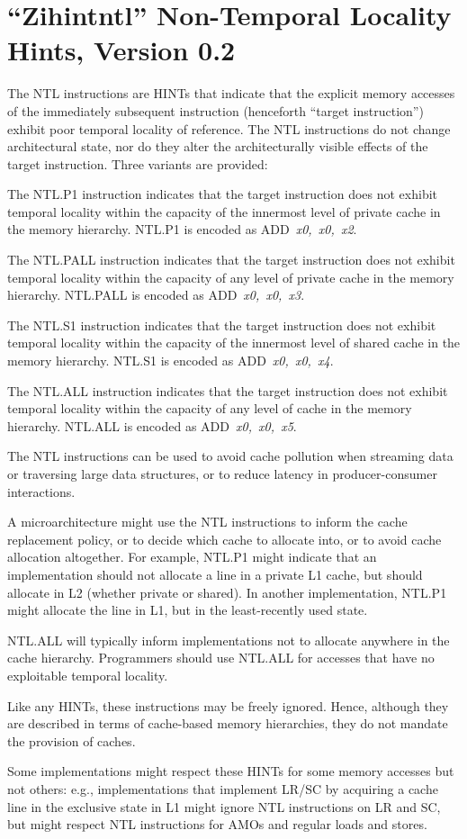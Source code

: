 \chapter{``Zihintntl'' Non-Temporal Locality Hints, Version 0.2}
\label{chap:zihintpause}

The NTL instructions are HINTs that indicate that the explicit memory accesses of the immediately subsequent
instruction (henceforth ``target instruction'') exhibit poor temporal locality of reference.
The NTL instructions do not change architectural state, nor do they alter the
architecturally visible effects of the target instruction.
Three variants are provided:

The NTL.P1 instruction indicates that the target instruction
does not exhibit temporal locality within the capacity of the innermost level
of private cache in the memory hierarchy.
NTL.P1 is encoded as \mbox{ADD {\em x0, x0, x2}}.

The NTL.PALL instruction indicates that the target instruction
does not exhibit temporal locality within the capacity of any
level of private cache in the memory hierarchy.
NTL.PALL is encoded as \mbox{ADD {\em x0, x0, x3}}.

The NTL.S1 instruction indicates that the target instruction
does not exhibit temporal locality within the capacity of the innermost level
of shared cache in the memory hierarchy.
NTL.S1 is encoded as \mbox{ADD {\em x0, x0, x4}}.

The NTL.ALL instruction indicates that the target
instruction does not exhibit temporal locality within the capacity of any
level of cache in the memory hierarchy.
NTL.ALL is encoded as \mbox{ADD {\em x0, x0, x5}}.

\begin{commentary}
The NTL instructions can be used to avoid cache pollution when streaming data
or traversing large data structures, or to reduce latency in producer-consumer
interactions.

A microarchitecture might use the NTL instructions to inform the cache
replacement policy, or to decide which cache to allocate into, or to avoid
cache allocation altogether.
For example, NTL.P1 might indicate that an implementation should not allocate
a line in a private L1 cache, but should allocate in L2 (whether private or
shared).
In another implementation, NTL.P1 might allocate the line in L1, but in
the least-recently used state.

NTL.ALL will typically inform implementations not to allocate anywhere in the
cache hierarchy.
Programmers should use NTL.ALL for accesses that have no exploitable temporal
locality.

Like any HINTs, these instructions may be freely ignored.
Hence, although they are described in terms of cache-based memory hierarchies,
they do not mandate the provision of caches.

Some implementations might respect these HINTs for some memory accesses but
not others: e.g., implementations that implement LR/SC by acquiring a
cache line in the exclusive state in L1 might ignore NTL instructions
on LR and SC, but might respect NTL instructions for
AMOs and regular loads and stores.
\end{commentary}

